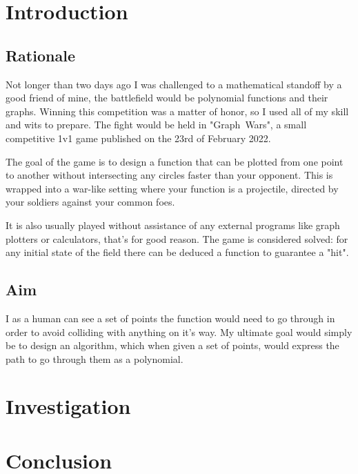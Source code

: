 \documentclass[12pt, titlepage]{article}
\title{}
\author{Artur Roos}
\date{October 2022}
\begin{document}
\maketitle

\section{Introduction}
\subsection{Rationale}
Not longer than two days ago I was challenged to a mathematical standoff by a 
good friend of mine, the battlefield would be polynomial functions and their 
graphs. Winning this competition was a matter of honor, so I used all of my 
skill and wits to prepare. The fight would be held in \mbox{"Graph Wars"}, a 
small competitive 1v1 game published on the 23rd of February 2022. 

The goal of the game is to design a function that can be plotted from one point
to another without intersecting any circles faster than your opponent. This
is wrapped into a war-like setting where your function is a projectile, directed
by your soldiers against your common foes.

It is also usually played without assistance of any external programs like 
graph plotters or calculators, that's for good reason. The game is considered
solved: for any initial state of the field there can be deduced a function to
guarantee a "hit". 

\subsection{Aim}
I as a human can see a set of points the function would need to go through 
in order to avoid colliding with anything on it's way. My ultimate goal 
would simply be to design an algorithm, which when given a set of points, 
would express the path to go through them as a polynomial.

\section{Investigation}
\section{Conclusion}
\end{document}
